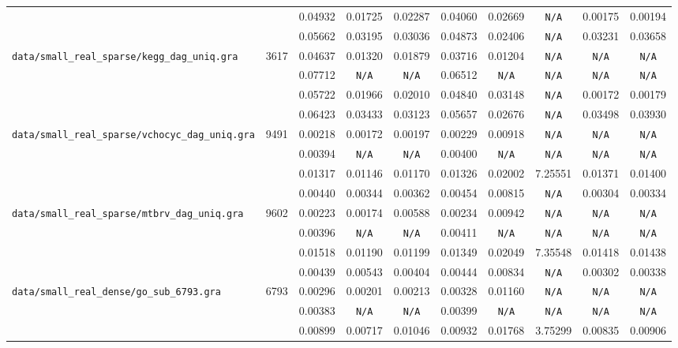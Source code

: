 \documentclass[12pt,a4paper,twoside]{article}
\begin{document}
{\begin{tabular}{ | l | c | c | c | c | c | c | c | c | c | }
\verb| | &  & 0.04932 & 0.01725 & 0.02287 & 0.04060 & 0.02669 & \verb|N/A| & 0.00175 & 0.00194 \\
\verb| | &  & 0.05662 & 0.03195 & 0.03036 & 0.04873 & 0.02406 & \verb|N/A| & 0.03231 & 0.03658 \\
\hline
\verb|data/small_real_sparse/kegg_dag_uniq.gra| & 3617 & 0.04637 & 0.01320 & 0.01879 & 0.03716 & 0.01204 & \verb|N/A| & \verb|N/A| & \verb|N/A| \\
\verb| | &  & 0.07712 & \verb|N/A| & \verb|N/A| & 0.06512 & \verb|N/A| & \verb|N/A| & \verb|N/A| & \verb|N/A| \\
\verb| | &  & 0.05722 & 0.01966 & 0.02010 & 0.04840 & 0.03148 & \verb|N/A| & 0.00172 & 0.00179 \\
\verb| | &  & 0.06423 & 0.03433 & 0.03123 & 0.05657 & 0.02676 & \verb|N/A| & 0.03498 & 0.03930 \\
\hline
\verb|data/small_real_sparse/vchocyc_dag_uniq.gra| & 9491 & 0.00218 & 0.00172 & 0.00197 & 0.00229 & 0.00918 & \verb|N/A| & \verb|N/A| & \verb|N/A| \\
\verb| | &  & 0.00394 & \verb|N/A| & \verb|N/A| & 0.00400 & \verb|N/A| & \verb|N/A| & \verb|N/A| & \verb|N/A| \\
\verb| | &  & 0.01317 & 0.01146 & 0.01170 & 0.01326 & 0.02002 & 7.25551 & 0.01371 & 0.01400 \\
\verb| | &  & 0.00440 & 0.00344 & 0.00362 & 0.00454 & 0.00815 & \verb|N/A| & 0.00304 & 0.00334 \\
\hline
\verb|data/small_real_sparse/mtbrv_dag_uniq.gra| & 9602 & 0.00223 & 0.00174 & 0.00588 & 0.00234 & 0.00942 & \verb|N/A| & \verb|N/A| & \verb|N/A| \\
\verb| | &  & 0.00396 & \verb|N/A| & \verb|N/A| & 0.00411 & \verb|N/A| & \verb|N/A| & \verb|N/A| & \verb|N/A| \\
\verb| | &  & 0.01518 & 0.01190 & 0.01199 & 0.01349 & 0.02049 & 7.35548 & 0.01418 & 0.01438 \\
\verb| | &  & 0.00439 & 0.00543 & 0.00404 & 0.00444 & 0.00834 & \verb|N/A| & 0.00302 & 0.00338 \\
\hline
\verb|data/small_real_dense/go_sub_6793.gra| & 6793 & 0.00296 & 0.00201 & 0.00213 & 0.00328 & 0.01160 & \verb|N/A| & \verb|N/A| & \verb|N/A| \\
\verb| | &  & 0.00383 & \verb|N/A| & \verb|N/A| & 0.00399 & \verb|N/A| & \verb|N/A| & \verb|N/A| & \verb|N/A| \\
\verb| | &  & 0.00899 & 0.00717 & 0.01046 & 0.00932 & 0.01768 & 3.75299 & 0.00835 & 0.00906 \\

\end{tabular}}
\end{document}

